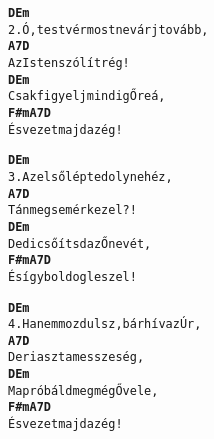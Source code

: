 \newpage
{}
\kottastart
{}
\kottaend
\begin{minipage}{\textwidth}
\begin{multicols}{2}
\begin{minipage}{\textwidth}
\begin{alltt}
\textbf{       D               Em}
2. Ó, testvér most ne várj tovább,
\textbf{      A7            D}
   Az Isten szólít rég!
\textbf{         D             Em}
   Csak figyelj mindig Őreá,
\textbf{       F#m   A7     D}
   És vezet majd az ég!
\end{alltt}
\vspace{0.0cm}
\versszakspacing
\end{minipage}
\begin{minipage}{\textwidth}
\begin{alltt}
\textbf{      D           Em}
3. Az első lépted oly nehéz,
\textbf{        A7          D}
   Tán meg sem érkezel?!
\textbf{       D           Em}
   De dicsőítsd az Ő nevét,
\textbf{      F#m      A7    D}
   És így boldog leszel!
\end{alltt}
\vspace{0.0cm}
\versszakspacing
\end{minipage}
\begin{minipage}{\textwidth}
\begin{alltt}
\textbf{       D                 Em}
4. Ha nem mozdulsz, bár hív az Úr,
\textbf{       A7             D}
   De riaszt a messzeség,
\textbf{        D             Em}
   Ma próbáld meg még Ővele,
\textbf{       F#m   A7     D}
   És vezet majd az ég!
\end{alltt}
\vspace{0.0cm}
\versszakspacing
\end{minipage}
\vspace{0.2cm}
\end{multicols}
\end{minipage}

